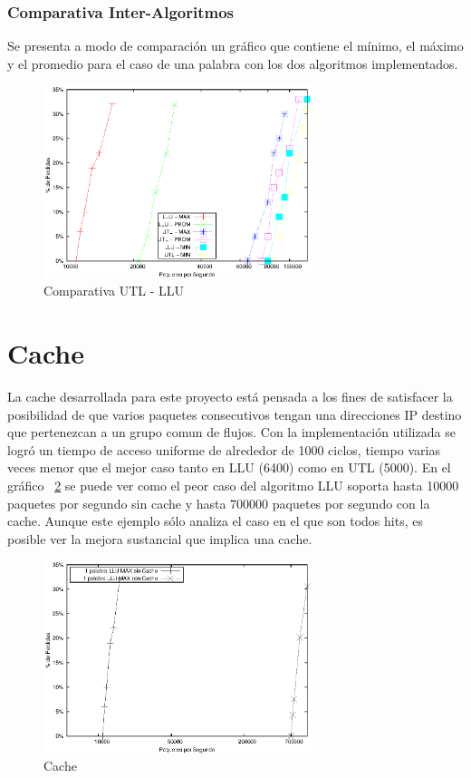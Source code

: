 \newpage
\subsubsection{Comparativa Inter-Algoritmos}
Se presenta a modo de comparación un gráfico que contiene el mínimo, el máximo y el promedio para el caso de una palabra con los dos algoritmos implementados. 
\begin{figure}[!h]
  \centering
	\includegraphics[width=0.7\textwidth]{5-resultados/graf/lluvsutl.eps}
  \caption{Comparativa UTL - LLU}
  \label{figvs}
\end{figure}


\newpage
\section{Cache}

La cache desarrollada para este proyecto está pensada a los fines de satisfacer la posibilidad de que varios paquetes consecutivos tengan una direcciones IP destino que pertenezcan a un grupo comun de flujos. Con la implementación utilizada se logró un tiempo de acceso uniforme de alrededor de 1000 ciclos, tiempo varias veces menor que el mejor caso tanto en LLU (6400) como en UTL (5000). En el gráfico ~\ref{fig:cachecomp} se puede ver como el peor caso del algoritmo LLU soporta hasta 10000 paquetes por segundo sin cache y hasta 700000 paquetes por segundo con la cache. Aunque este ejemplo sólo analiza el caso en el que son todos hits, es posible ver la mejora sustancial que implica una cache. 

\begin{figure}[!h]
  \centering
	\includegraphics[width=0.7\textwidth]{5-resultados/graf/cachecomp.eps}
  \caption{Cache }
  \label{fig:cachecomp}
\end{figure}


